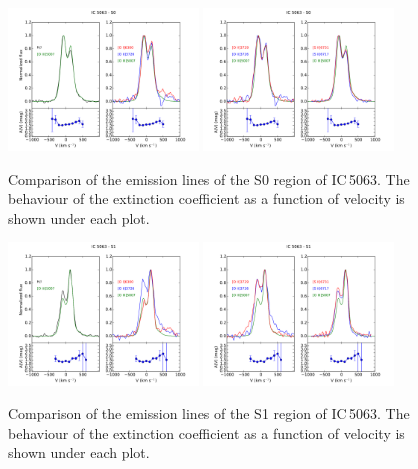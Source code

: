 \documentclass[../main.tex]{subfiles}
\begin{document}
\begin{figure}
\centering
\includegraphics[width=0.45\textwidth]{images/paper1/IC5063_s0_l1.pdf} \quad
\includegraphics[width=0.45\textwidth]{images/paper1/IC5063_s0_l2.pdf}\\
\caption[]{Comparison of the emission lines of the S0 region of IC\,5063. The behaviour of the extinction coefficient as a function of velocity is shown under each plot.}
\label{fig:s0l1_I}
\end{figure}

\begin{figure}
\centering
\includegraphics[width=0.45\textwidth]{images/paper1/IC5063_s1_l1.pdf} \quad
\includegraphics[width=0.45\textwidth]{images/paper1/IC5063_s1_l2.pdf}\\
\caption[]{Comparison of the emission lines of the S1 region of IC\,5063. The behaviour of the extinction coefficient as a function of velocity is shown under each plot.}
\label{fig:s1l1_I}
\end{figure}
\end{document}
